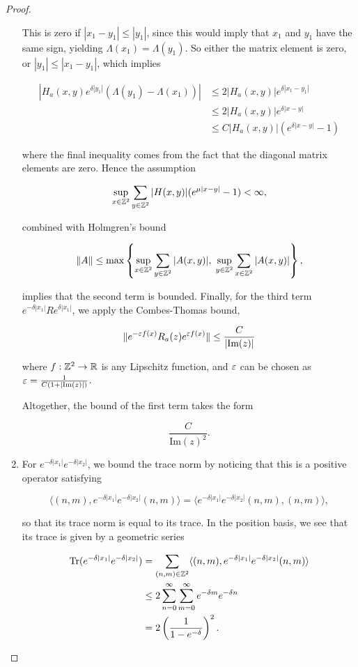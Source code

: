 \documentclass[12pt, letterpaper]{article}
\begin{document}
\begin{proof}
\begin{enumerate}
This is zero if $|x_1-y_1|\leq |y_1|$, since this would imply that $x_1$ and $y_1$ have the same sign, yielding $\Lambda(x_1)=\Lambda(y_1)$. So either the matrix element is zero, or $|y_1|\leq|x_1-y_1|$, which implies

\[\begin{aligned}
|H_a(x,y)e^{\delta|y_1|}(\Lambda(y_1)-\Lambda(x_1))| &\leq 2|H_a(x,y)|e^{\delta|x_1-y_1|}\\
&\leq 2|H_a(x,y)|e^{\delta|x-y|}\\
&\leq C|H_a(x,y)|(e^{\delta|x-y|}-1)
\end{aligned}\]

where the final inequality comes from the fact that the diagonal matrix elements are zero. Hence the assumption 

\[\sup_{x\in\mathbb{Z}^2}\sum_{y\in\mathbb{Z}^2}|H(x,y)|(e^{\mu|x-y|}-1)<\infty,\]

combined with Holmgren's bound

\[\lVert A \rVert \leq \max \left\{ \sup_{x\in\mathbb{Z}^2} \sum_{y\in\mathbb{Z}^2} |A(x,y)|, \; \sup_{y\in\mathbb{Z}^2}\sum_{x\in\mathbb{Z}^2}|A(x,y)| \right\},\]

implies that the second term is bounded. Finally, for the third term $e^{-\delta|x_1|}Re^{\delta|x_1|}$, we apply the Combes-Thomas bound,

\[\lVert e^{-\varepsilon f(x)}R_a(z)e^{\varepsilon f(x)} \rVert \leq \frac{C}{|\text{Im}(z)|}\]

where $f:\mathbb{Z}^2\to\mathbb{R}$ is any Lipschitz function, and $\varepsilon$ can be chosen as $\varepsilon = \frac{1}{C(1+|\text{Im}(z)|)}$.

Altogether, the bound of the first term takes the form 

\[\frac{C}{\text{Im}(z)^2}.\]

\item For $e^{-\delta|x_1|}e^{-\delta|x_2|}$, we bound the trace norm by noticing that this is a positive operator satisfying 

\[\langle (n,m), e^{-\delta|x_1|}e^{-\delta|x_2|} (n,m) \rangle = \langle e^{-\delta|x_1|}e^{-\delta|x_2|}(n,m), (n,m) \rangle,\]

so that its trace norm is equal to its trace. In the position basis, we see that its trace is given by a geometric series

\[\begin{aligned}
\text{Tr}(e^{-\delta|x_1|}e^{-\delta|x_2|}) &= \sum_{(n,m)\in\mathbb{Z}^2} \langle (n,m), e^{-\delta|x_1|}e^{-\delta|x_2|} (n,m) \rangle \\
&\leq 2 \sum_{n=0}^\infty \sum_{m=0}^\infty e^{-\delta m}e^{-\delta n} \\
&= 2\left(\frac{1}{1-e^{-\delta}}\right)^2.
\end{aligned}\]


\end{enumerate}
\end{proof}
\end{document}
